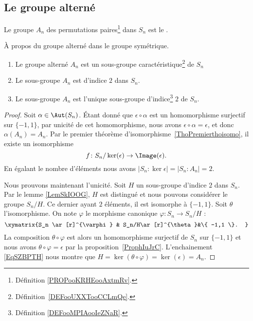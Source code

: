\subsection{Le groupe alterné}

\begin{definition}      \label{DEFooEIVIooFvVkHH}
	Le groupe \( A_n\) des permutations paires\footnote{Définition \ref{PROPooKRHEooAxtmRv}.} dans \( S_n\) est le .
\end{definition}

\begin{proposition} \label{PROPooCPXOooVxPAij}
	À propos du groupe alterné dans le groupe symétrique.
	\begin{enumerate}
		\item
		      Le groupe alterné \( A_n\) est un sous-groupe caractéristique\footnote{Définition~\ref{DEFooUXXTooCCLmQe}.} de \( S_n\)
		\item   \label{ITEMooWXXUooOWvFgE}
		      Le sous-groupe \( A_n\) est d'indice \( 2\) dans \( S_n\).
		\item       \label{ITEMooGGAHooRYgNqq}
		      Le sous-groupe \( A_n\) est l'unique sous-groupe d'indice\footnote{Définition \ref{DEFooMPIAooIeZNaR}.} \( 2\) de \( S_n\).
	\end{enumerate}
\end{proposition}

\begin{proof}
	Soit \( \alpha\in \Aut(S_n)\). Étant donné que \( \epsilon\circ\alpha\) est un homomorphisme surjectif sur \( \{ -1,1 \}\), par unicité de cet homomorphisme, nous avons \( \epsilon\circ\alpha=\epsilon\), et donc \( \alpha(A_n)=A_n\). Par le premier théorème d'isomorphisme~\ref{ThoPremierthoisomo}, il existe un isomorphisme
	\begin{equation}
		f\colon S_n/\ker(\epsilon)\to \Image(\epsilon).
	\end{equation}
	En égalant le nombre d'éléments nous avons \( | S_n:\ker\epsilon |=| S_n:A_n |=2\).

	Nous prouvons maintenant l'unicité. Soit \( H\) un sous-groupe d'indice \( 2\) dans \( S_n\). Par le lemme \ref{LemSkIOOG}, \( H\) est distingué et nous pouvons considérer le groupe \( S_n/H\). Ce dernier ayant \( 2\) éléments, il est isomorphe à \( \{ -1,1 \}\). Soit \( \theta\) l'isomorphisme. On note \( \varphi\) le morphisme canonique \( \varphi\colon S_n\to S_n/H\) :
	\begin{equation}    \label{EqSZBPTH}
		\xymatrix{%
			S_n \ar[r]^{\varphi}        &   S_n/H\ar[r]^{\theta}&\{ -1,1 \}.
		}
	\end{equation}
	La composition \( \theta \circ \varphi\) est alors un homomorphisme surjectif de \( S_n\) sur \( \{ -1,1 \}\) et nous avons \( \theta\circ\varphi=\epsilon\) par la proposition~\ref{ProphIuJrC}. L'enchainement \eqref{EqSZBPTH} nous montre que \( H=\ker(\theta\circ\varphi)=\ker(\epsilon)=A_n\).
\end{proof}

